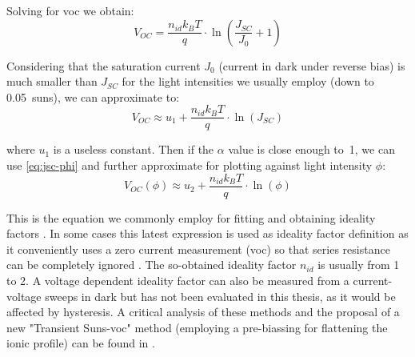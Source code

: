 		Solving for \gls{voc} we obtain:
		$$V_{OC} = \frac{n_{id}k_BT}{q}\cdot\ln\left(\frac{J_{SC}}{J_0} + 1\right)$$

		Considering that the saturation current $J_0$ (current in dark under reverse bias) is much smaller than $J_{SC}$ for the light intensities we usually employ (down to \SI{0.05}{suns}), we can approximate to:
		$$V_{OC} \approx u_1 + \frac{n_{id}k_BT}{q}\cdot\ln(J_{SC})$$

		where $u_1$ is a useless constant. Then if the $\alpha$ value is close enough to~1, we can use \cref{eq:jsc-phi} and further approximate for plotting against light intensity $\phi$:
\begin{equation}\label{eq:voc_vs_phi}
V_{OC}(\phi) \approx u_2 + \frac{n_{id}k_BT}{q}\cdot\ln(\phi)
\end{equation}

		This is the equation we commonly employ for fitting and obtaining ideality factors \cite{Nelson2003}. In some cases this latest expression is used as ideality factor definition as it conveniently uses a zero current measurement (\gls{voc}) so that series resistance can be completely ignored \cite{Kirchartz2012}. %
		The so-obtained ideality factor $n_{id}$ is usually from 1 to 2. A voltage dependent ideality factor can also be measured from a current-voltage sweeps in dark but has not been evaluated in this thesis, as it would be affected by hysteresis. A critical analysis of these methods and the proposal of a new "Transient Suns-\gls{voc}" method (employing a pre-biassing for flattening the ionic profile) can be found in . %

